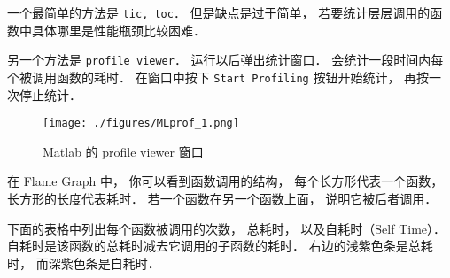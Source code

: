 
\begin{issues}
\issueDraft
\end{issues}


一个最简单的方法是 \verb|tic, toc|． 但是缺点是过于简单， 若要统计层层调用的函数中具体哪里是性能瓶颈比较困难．

另一个方法是 \verb|profile viewer|． 运行以后弹出统计窗口． 会统计一段时间内每个被调用函数的耗时． 在窗口中按下 \verb|Start Profiling| 按钮开始统计， 再按一次停止统计．

\begin{figure}[ht]
\centering
\texttt{[image: ./figures/MLprof\_1.png]}
\caption{Matlab 的 profile viewer 窗口} \label{MLprof_fig1}
\end{figure}

在 Flame Graph 中， 你可以看到函数调用的结构， 每个长方形代表一个函数， 长方形的长度代表耗时． 若一个函数在另一个函数上面， 说明它被后者调用．

下面的表格中列出每个函数被调用的次数， 总耗时， 以及自耗时（Self Time）． 自耗时是该函数的总耗时减去它调用的子函数的耗时． 右边的浅紫色条是总耗时， 而深紫色条是自耗时．
